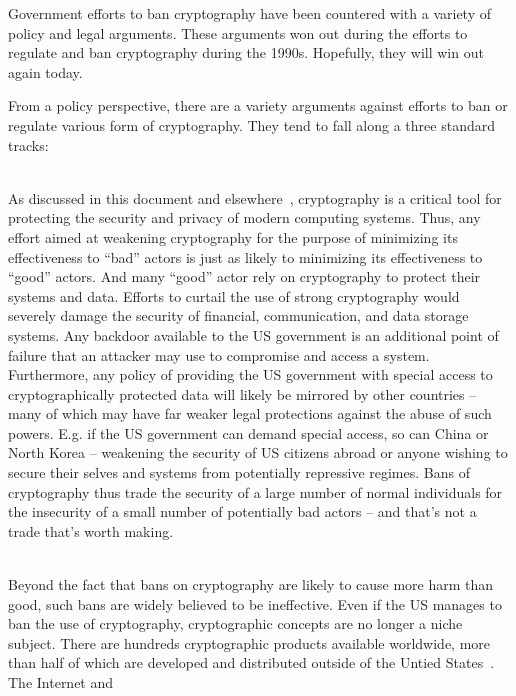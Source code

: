 Government efforts to ban cryptography have been countered with a
variety of policy and legal arguments. These arguments won out during
the efforts to regulate and ban cryptography during the
1990s. Hopefully, they will win out again today.

From a policy perspective, there are a variety arguments against
efforts to ban or regulate various form of cryptography. They tend to
fall along a three standard tracks:

\begin{packed_desc}
\item[More Harm Than Good] \hfill \\ As discussed in this document and
  elsewhere~\cite{abelson2015}, cryptography is a critical tool for
  protecting the security and privacy of modern computing
  systems. Thus, any effort aimed at weakening cryptography for the
  purpose of minimizing its effectiveness to ``bad'' actors is just as
  likely to minimizing its effectiveness to ``good'' actors. And many
  ``good'' actor rely on cryptography to protect their systems and
  data. Efforts to curtail the use of strong cryptography would
  severely damage the security of financial, communication, and data
  storage systems. Any backdoor available to the US government is an
  additional point of failure that an attacker may use to compromise
  and access a system. Furthermore, any policy of providing the US
  government with special access to cryptographically protected data
  will likely be mirrored by other countries -- many of which may have
  far weaker legal protections against the abuse of such
  powers. E.g. if the US government can demand special access, so can
  China or North Korea -- weakening the security of US citizens abroad
  or anyone wishing to secure their selves and systems from
  potentially repressive regimes. Bans of cryptography thus trade the
  security of a large number of normal individuals for the insecurity
  of a small number of potentially bad actors -- and that's not a
  trade that's worth making.
\item[Ineffectiveness] \hfill \\ Beyond the fact that bans on
  cryptography are likely to cause more harm than good, such bans are
  widely believed to be ineffective. Even if the US manages to ban the
  use of cryptography, cryptographic concepts are no longer a niche
  subject. There are hundreds cryptographic products available
  worldwide, more than half of which are developed and distributed
  outside of the Untied States~\cite{schneier2016}. The Internet and

\end{packed_desc}
